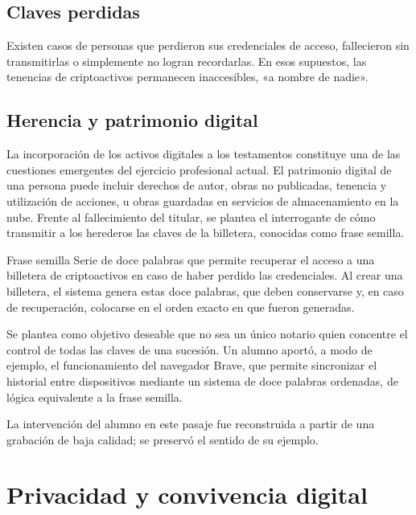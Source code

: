 \documentclass[12pt,oneside]{book}
\begin{document}
\subsection{Claves perdidas}

Existen casos de personas que perdieron sus credenciales de acceso, fallecieron sin transmitirlas o simplemente no logran recordarlas. En esos supuestos, las tenencias de criptoactivos permanecen inaccesibles, «a nombre de nadie».

\subsection{Herencia y patrimonio digital}

La incorporación de los activos digitales a los testamentos constituye una de las cuestiones emergentes del ejercicio profesional actual. El patrimonio digital de una persona puede incluir derechos de autor, obras no publicadas, tenencia y utilización de acciones, u obras guardadas en servicios de almacenamiento en la nube. Frente al fallecimiento del titular, se plantea el interrogante de cómo transmitir a los herederos las claves de la billetera, conocidas como frase semilla.

\begin{definition}{Frase semilla}
Serie de doce palabras que permite recuperar el acceso a una billetera de criptoactivos en caso de haber perdido las credenciales. Al crear una billetera, el sistema genera estas doce palabras, que deben conservarse y, en caso de recuperación, colocarse en el orden exacto en que fueron generadas.
\end{definition}

Se plantea como objetivo deseable que no sea un único notario quien concentre el control de todas las claves de una sucesión. Un alumno aportó, a modo de ejemplo, el funcionamiento del navegador Brave, que permite sincronizar el historial entre dispositivos mediante un sistema de doce palabras ordenadas, de lógica equivalente a la frase semilla.

\begin{note}
La intervención del alumno en este pasaje fue reconstruida a partir de una grabación de baja calidad; se preservó el sentido de su ejemplo.
\end{note}

\section{Privacidad y convivencia digital}
\end{document}
